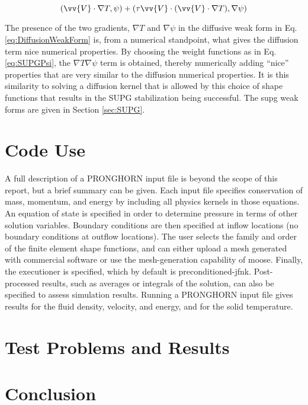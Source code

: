 \documentclass[10pt]{article}
\numberwithin{equation}{section} %
\begin{document}
\begin{equation}
\label{eq:AdvectiveWeakForm2}
(\vv{V}\cdot\nabla T,\psi)+(\tau\vv{V}\cdot(\vv{V}\cdot\nabla T),\nabla\psi)
\end{equation}

The presence of the two gradients, \(\nabla T\) and \(\nabla\psi\) in the diffusive weak form in Eq. \eqref{eq:DiffusionWeakForm} is, from a numerical standpoint, what gives the diffusion term nice numerical properties. By choosing the weight functions as in Eq. \eqref{eq:SUPGPsi}, the \(\nabla T\nabla\psi\) term is obtained, thereby numerically adding ``nice'' properties that are very similar to the diffusion numerical properties. It is this similarity to solving a diffusion kernel that is allowed by this choice of shape functions that results in the SUPG stabilization being successful. The \gls{supg} weak forms are given in Section \ref{sec:SUPG}.

\section{Code Use}

A full description of a PRONGHORN input file is beyond the scope of this report, but a brief summary can be given. Each input file specifies conservation of mass, momentum, and energy by including all physics kernels in those equations. An equation of state is specified in order to determine pressure in terms of other solution variables. Boundary conditions are then specified at inflow locations (no boundary conditions at outflow locations). The user selects the family and order of the finite element shape functions, and can either upload a mesh generated with commercial software or use the mesh-generation capability of \gls{moose}. Finally, the executioner is specified, which by default is preconditioned-\gls{jfnk}. Post-processed results, such as averages or integrals of the solution, can also be specified to assess simulation results. Running a PRONGHORN input file gives results for the fluid density, velocity, and energy, and for the solid temperature. 

\section{Test Problems and Results}

\section{Conclusion}
\end{document}
